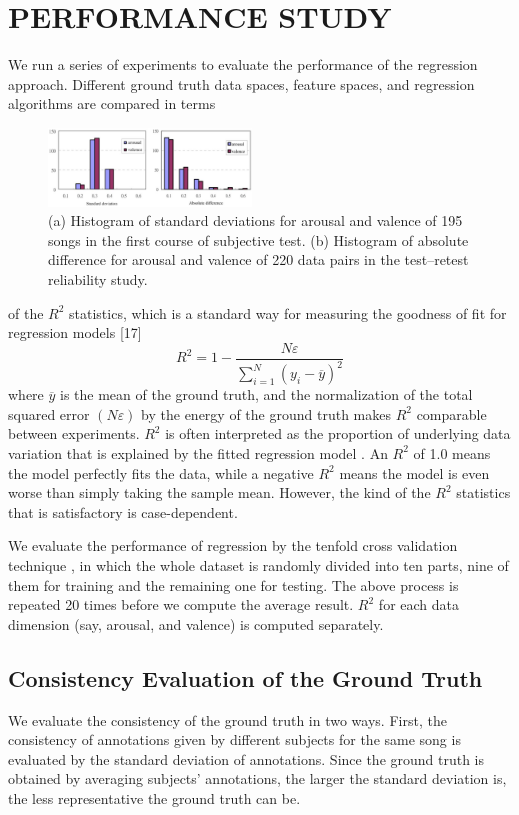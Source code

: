 \documentclass[journal, twoside]{IEEEtran}
\begin{document}
\section{PERFORMANCE STUDY}
We run a series of experiments to evaluate the performance of the regression approach. Different ground truth data spaces, feature spaces, and regression algorithms are compared in terms
\begin{figure}[h]
\centering
\captionsetup{justification=centering}
\includegraphics[width=0.48\textwidth, height=0.18\textwidth]{fig3.png}
\caption{(a) Histogram of standard deviations for arousal and valence of 195
songs in the first course of subjective test. (b) Histogram of absolute difference
for arousal and valence of 220 data pairs in the test–retest reliability study.}
\label{fig3}
\end{figure}
of the \(R^2\) statistics, which is a standard way for measuring the
goodness of fit for regression models [17]
\begin{equation}
R^2 = 1 - \frac{N \varepsilon}{ \sum_{i=1}^N (y_i - \overline{y})^2}
\end{equation}
where \(\overline{y}\) is the mean of the ground truth, and the normalization of the total squared error \((N \varepsilon)\) by the energy of the ground truth makes \(R^2\) comparable between experiments. \(R^2\) is often interpreted as the proportion of underlying data variation that is explained by the fitted regression model \cite{32}. An \(R^2\) of 1.0 means the model perfectly fits the data, while a negative \(R^2\) means the model is even worse than simply taking the sample mean. However, the kind of the \(R^2\) statistics that is satisfactory is case-dependent.

We evaluate the performance of regression by the tenfold cross validation technique \cite{16}, in which the whole dataset is randomly divided into ten parts, nine of them for training and the remaining one for testing. The above process is repeated 20 times before we compute the average result. \(R^2\) for each data dimension (say, arousal, and valence) is computed separately.

\subsection{Consistency Evaluation of the Ground Truth}
We evaluate the consistency of the ground truth in two ways. First, the consistency of annotations given by different subjects for the same song is evaluated by the standard deviation of annotations. Since the ground truth is obtained by averaging subjects’ annotations, the larger the standard deviation is, the less representative the ground truth can be.
\end{document}
